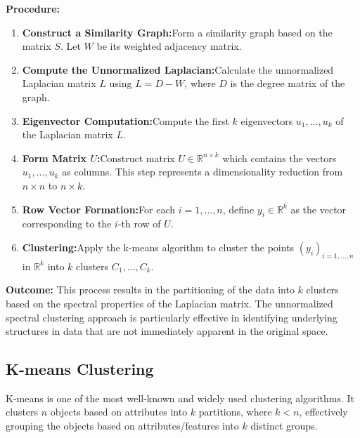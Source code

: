 \documentclass[unicode,11pt,a4paper,oneside,numbers=endperiod,openany]{scrartcl}
\begin{document}
\textbf{Procedure:}
\begin{enumerate}
    \item \textbf{Construct a Similarity Graph:}\newline Form a similarity graph based on the matrix \( S \). Let \( W \) be its weighted adjacency matrix.

    \item \textbf{Compute the Unnormalized Laplacian:}\newline Calculate the unnormalized Laplacian matrix \( L \) using \( L = D - W \), where \( D \) is the degree matrix of the graph.

    \item \textbf{Eigenvector Computation:}\newline Compute the first \( k \) eigenvectors \( u_1, \ldots, u_k \) of the Laplacian matrix \( L \).

    \item \textbf{Form Matrix \( U \):}\newline Construct matrix \( U \in \mathbb{R}^{n \times k} \) which contains the vectors \( u_1, \ldots, u_k \) as columns. This step represents a dimensionality reduction from \( n \times n \) to \( n \times k \).

    \item \textbf{Row Vector Formation:}\newline For each \( i = 1, \ldots, n \), define \( y_i \in \mathbb{R}^k \) as the vector corresponding to the \( i \)-th row of \( U \).

    \item \textbf{Clustering:}\newline Apply the k-means algorithm to cluster the points \( (y_i)_{i=1, \ldots, n} \) in \( \mathbb{R}^k \) into \( k \) clusters \( C_1, \ldots, C_k \).
\end{enumerate}

\textbf{Outcome:}
This process results in the partitioning of the data into \( k \) clusters based on the spectral properties of the Laplacian matrix. The unnormalized spectral clustering approach is particularly effective in identifying underlying structures in data that are not immediately apparent in the original space.

\subsection{K-means Clustering}
K-means is one of the most well-known and widely used clustering algorithms. It clusters \( n \) objects based on attributes into \( k \) partitions, where \( k < n \), effectively grouping the objects based on attributes/features into \( k \) distinct groups.
\end{document}
